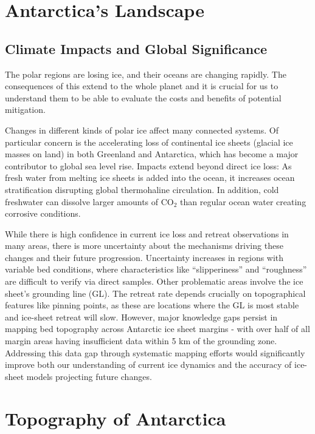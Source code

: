 \chapter{Antarctica's Landscape}\label{why}
\section{Climate Impacts and Global Significance}

The polar regions are losing ice, and their oceans are changing rapidly\cite{O_C_in_changingClimate}. The consequences of this extend to the whole planet and it is crucial for us to understand them to be able to evaluate the costs and benefits of potential mitigation. 

Changes in different kinds of polar ice affect many connected systems. Of particular concern is the accelerating loss of continental ice sheets (glacial ice masses on land) in both Greenland and Antarctica, which has become a major contributor to global sea level rise\cite{O_C_in_changingClimate}. Impacts extend beyond direct ice loss: As fresh water from melting ice sheets is added into the ocean, it increases ocean stratification disrupting global thermohaline circulation\cite{Jacobs_2004}. In addition, cold freshwater can dissolve larger amounts of $\mathrm{CO_2}$ than regular ocean water creating corrosive conditions\cite{O_C_in_changingClimate}.
 
While there is high confidence in current ice loss and retreat observations in many areas, there is more uncertainty about the mechanisms driving these changes and their future progression\cite{Fox-Kemper_2021}. Uncertainty increases in regions with variable bed conditions, where characteristics like ``slipperiness'' and ``roughness'' are difficult to verify via direct samples. Other problematic areas involve the ice sheet's grounding line (GL). The retreat rate depends crucially on topographical features like pinning points, as these are locations where the GL is most stable and ice-sheet retreat will slow\cite{Fox-Kemper_2021}. However, major knowledge gaps persist in mapping bed topography across Antarctic ice sheet margins - with over half of all margin areas having insufficient data within 5 km of the grounding zone\cite{RINGS_2022}. Addressing this data gap through systematic mapping efforts would significantly improve both our understanding of current ice dynamics and the accuracy of ice-sheet models projecting future changes.

\chapter{Topography of Antarctica}\label{review}


